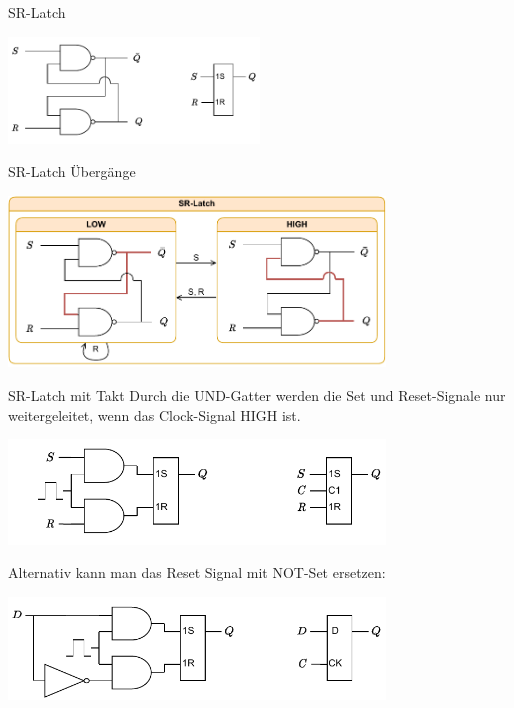 \begin{defi}{SR-Latch}
    \begin{center}
        \includegraphics[width=0.5\textwidth]{includes/figures/defi_sr_latch.pdf}
    \end{center}
\end{defi}

\begin{bonus}{SR-Latch Übergänge}
    \begin{center}
        \includegraphics[width=0.75\textwidth]{includes/figures/bonus_sr_latch.pdf}
    \end{center}
\end{bonus}

\begin{defi}{SR-Latch mit Takt}
    Durch die UND-Gatter werden die Set und Reset-Signale nur weitergeleitet, wenn das Clock-Signal HIGH ist.

    \begin{center}
        \includegraphics[width=0.75\textwidth]{includes/figures/defi_lr_latch_clock.pdf}
    \end{center}

    Alternativ kann man das Reset Signal mit NOT-Set ersetzen:

    \begin{center}
        \includegraphics[width=0.75\textwidth]{includes/figures/defi_lr_latch_clock2.pdf}
    \end{center}
\end{defi}

